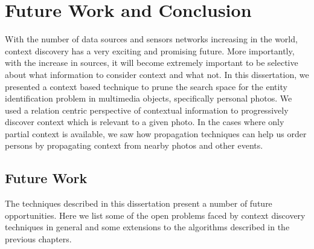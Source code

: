 \chapter{Future Work and Conclusion}

With the number of data sources and sensors networks increasing in the world, context discovery has a very exciting and promising future. More importantly, with the increase in sources, it will become extremely important to be selective about what information to consider context and what not. In this dissertation, we presented a context based technique to prune the search space for the entity identification problem in multimedia objects, specifically personal photos. We used a relation centric perspective of contextual information to progressively discover context which is relevant to a given photo. In the cases where only partial context is available, we saw how propagation techniques can help us order persons by propagating context from nearby photos and other events.


\section{Future Work}
The techniques described in this dissertation present a number of future opportunities. Here we list some of the open problems faced by context discovery techniques in general and some extensions to the algorithms described in the previous chapters. 

